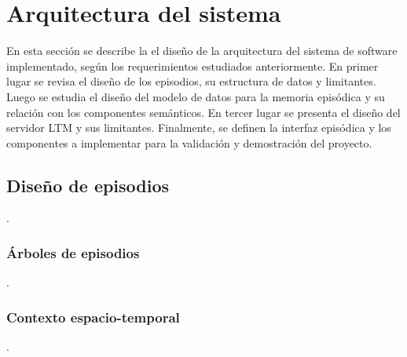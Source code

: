 


 
\section{Arquitectura del sistema}
 
 En esta sección se describe la el diseño de la arquitectura del sistema de software implementado, según los requerimientos estudiados anteriormente. En primer lugar se revisa el diseño de los episodios, su estructura de datos y limitantes. Luego se estudia el diseño del modelo de datos para la memoria episódica y su relación con los componentes semánticos. En tercer lugar se presenta el diseño del servidor LTM y sus limitantes. Finalmente, se definen la interfaz episódica y los componentes a implementar para la validación y demostración del proyecto.
 
 
\subsection{Diseño de episodios}
 .
 
\subsubsection{Árboles de episodios}
 .
 
\subsubsection{Contexto espacio-temporal}
 .

